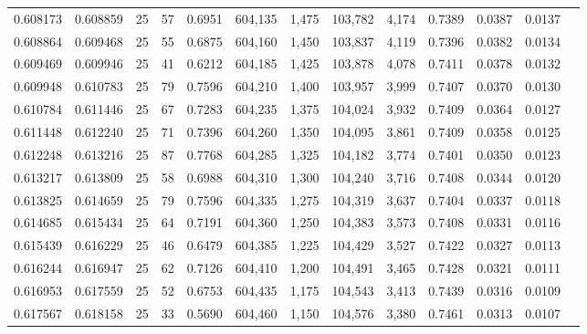 \begin{tabular}{rrrrrrrrrrrrr}
0.608173 & 0.608859 &    25 &  57 &                                     0.6951 & 604,135 &   1,475 & 103,782 &   4,174 & 0.7389 & 0.0387 & 0.0137 \\
0.608864 & 0.609468 &    25 &  55 &                                     0.6875 & 604,160 &   1,450 & 103,837 &   4,119 & 0.7396 & 0.0382 & 0.0134 \\
0.609469 & 0.609946 &    25 &  41 &                                     0.6212 & 604,185 &   1,425 & 103,878 &   4,078 & 0.7411 & 0.0378 & 0.0132 \\
0.609948 & 0.610783 &    25 &  79 &                                     0.7596 & 604,210 &   1,400 & 103,957 &   3,999 & 0.7407 & 0.0370 & 0.0130 \\
0.610784 & 0.611446 &    25 &  67 &                                     0.7283 & 604,235 &   1,375 & 104,024 &   3,932 & 0.7409 & 0.0364 & 0.0127 \\
0.611448 & 0.612240 &    25 &  71 &                                     0.7396 & 604,260 &   1,350 & 104,095 &   3,861 & 0.7409 & 0.0358 & 0.0125 \\
0.612248 & 0.613216 &    25 &  87 &                                     0.7768 & 604,285 &   1,325 & 104,182 &   3,774 & 0.7401 & 0.0350 & 0.0123 \\
0.613217 & 0.613809 &    25 &  58 &                                     0.6988 & 604,310 &   1,300 & 104,240 &   3,716 & 0.7408 & 0.0344 & 0.0120 \\
0.613825 & 0.614659 &    25 &  79 &                                     0.7596 & 604,335 &   1,275 & 104,319 &   3,637 & 0.7404 & 0.0337 & 0.0118 \\
0.614685 & 0.615434 &    25 &  64 &                                     0.7191 & 604,360 &   1,250 & 104,383 &   3,573 & 0.7408 & 0.0331 & 0.0116 \\
0.615439 & 0.616229 &    25 &  46 &                                     0.6479 & 604,385 &   1,225 & 104,429 &   3,527 & 0.7422 & 0.0327 & 0.0113 \\
0.616244 & 0.616947 &    25 &  62 &                                     0.7126 & 604,410 &   1,200 & 104,491 &   3,465 & 0.7428 & 0.0321 & 0.0111 \\
0.616953 & 0.617559 &    25 &  52 &                                     0.6753 & 604,435 &   1,175 & 104,543 &   3,413 & 0.7439 & 0.0316 & 0.0109 \\
0.617567 & 0.618158 &    25 &  33 &                                     0.5690 & 604,460 &   1,150 & 104,576 &   3,380 & 0.7461 & 0.0313 & 0.0107 \\

\end{tabular}
